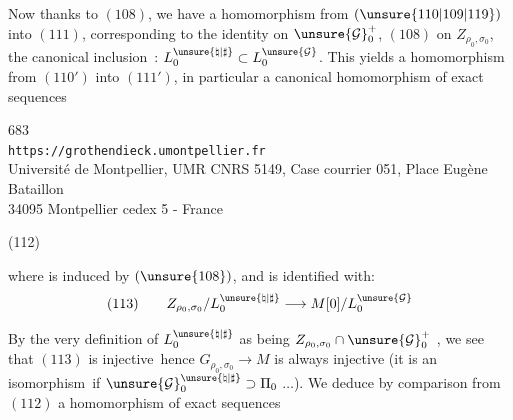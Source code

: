 Now thanks to $(108)$, we have a homomorphism from $(\unsure{110|109|119})$ into $(111)$,
corresponding to the identity on $\unsure{\mathcal G}_0^+$,
$(108)$ on $Z_{\rho_0,\sigma_0}$, the canonical inclusion\ :
$L_0^{\unsure{\natural|\sharp}}\subset L_0^{\unsure{\mathcal G}}$.
This yields a homomorphism from $(110')$ into $(111')$, in particular a canonical
homomorphism of exact sequences


\begin{center}
683\\
\texttt{https://grothendieck.umontpellier.fr}\\
Université de Montpellier, UMR CNRS 5149, Case courrier 051, Place Eugène Bataillon\\
34095 Montpellier cedex 5 - France
\end{center}



\begin{samepage}
(112)\quad
{}
\end{samepage}

where
is  induced by
$(\unsure{108})$, and is identified with:
\[
(113)\qquad Z_{\rho_0,\sigma_0}/L_0^{\unsure{\natural|\sharp}}
\longrightarrow M[0]/L_0^{\unsure{\mathcal G}}
\]

By the very definition of
$L_0^{\unsure{\natural|\sharp}}$ as being
$Z_{\rho_0,\sigma_0}\cap\unsure{\mathcal G}_0^+$
, we see that $(113)$ is injective\ hence
$G_{\rho_0,\sigma_0}\longrightarrow M$ is always injective
(it is an isomorphism\ if
$\unsure{\mathcal G}_0^{\unsure{\natural|\sharp}}\supset\Pi_0$
$\ldots$).
We deduce by comparison from $(112)$ a homomorphism of exact sequences

